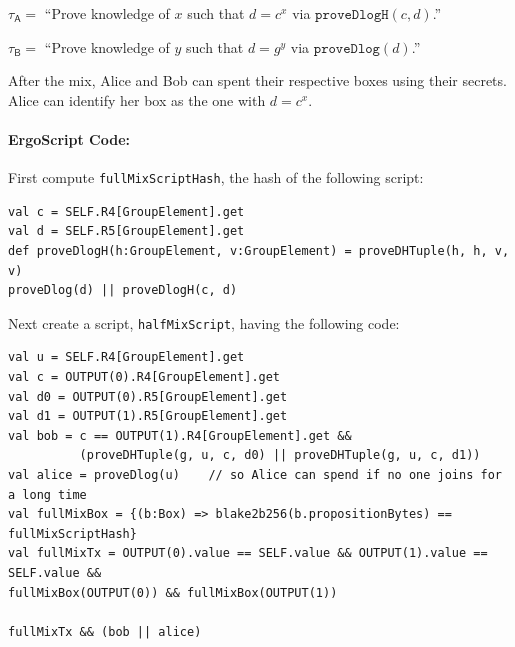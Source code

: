 \documentclass[11pt]{article}
\newcommand{\langname}{ErgoScript\xspace}
\newcommand{\mixname}{ErgoMix\xspace}
\begin{document}
\begin{enumerate}
\begin{enumerate}
		$\tau_\textsf{A} = $ ``Prove knowledge of $x$ such that ${d} = {c}^{x}$ via $\texttt{proveDlogH}(c, d)$.''
		
		$\tau_{\textsf{B}} = $ ``Prove knowledge of $y$ such that $d = {g}^{y}$ via $\texttt{proveDlog}(d)$.''
		
	\end{enumerate}
	
\end{enumerate}
After the mix, Alice and Bob can spent their respective boxes using their secrets. 
Alice can identify her box as the one with $d = c^x$. 

\paragraph{\langname Code:} First compute \texttt{fullMixScriptHash}, the hash of the following script:
\begin{verbatim}
val c = SELF.R4[GroupElement].get 
val d = SELF.R5[GroupElement].get 
def proveDlogH(h:GroupElement, v:GroupElement) = proveDHTuple(h, h, v, v)
proveDlog(d) || proveDlogH(c, d)
\end{verbatim}

Next create a script, \texttt{halfMixScript}, having the following code:
\begin{verbatim}
val u = SELF.R4[GroupElement].get
val c = OUTPUT(0).R4[GroupElement].get 
val d0 = OUTPUT(0).R5[GroupElement].get 
val d1 = OUTPUT(1).R5[GroupElement].get 
val bob = c == OUTPUT(1).R4[GroupElement].get && 
          (proveDHTuple(g, u, c, d0) || proveDHTuple(g, u, c, d1))
val alice = proveDlog(u)    // so Alice can spend if no one joins for a long time
val fullMixBox = {(b:Box) => blake2b256(b.propositionBytes) == fullMixScriptHash}
val fullMixTx = OUTPUT(0).value == SELF.value && OUTPUT(1).value == SELF.value && 
fullMixBox(OUTPUT(0)) && fullMixBox(OUTPUT(1))

fullMixTx && (bob || alice)
\end{verbatim}
\end{document}
